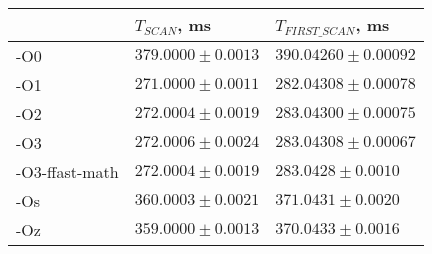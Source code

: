 \begin{tabular}{lll}
\toprule
 & $T_{SCAN}$, ms & $T_{FIRST\_SCAN}$, ms \\
\midrule
-O0 & $379.0000 \pm 0.0013$ & $390.04260 \pm 0.00092$ \\
-O1 & $271.0000 \pm 0.0011$ & $282.04308 \pm 0.00078$ \\
-O2 & $272.0004 \pm 0.0019$ & $283.04300 \pm 0.00075$ \\
-O3 & $272.0006 \pm 0.0024$ & $283.04308 \pm 0.00067$ \\
-O3-ffast-math & $272.0004 \pm 0.0019$ & $283.0428 \pm 0.0010$ \\
-Os & $360.0003 \pm 0.0021$ & $371.0431 \pm 0.0020$ \\
-Oz & $359.0000 \pm 0.0013$ & $370.0433 \pm 0.0016$ \\
\bottomrule
\end{tabular}
